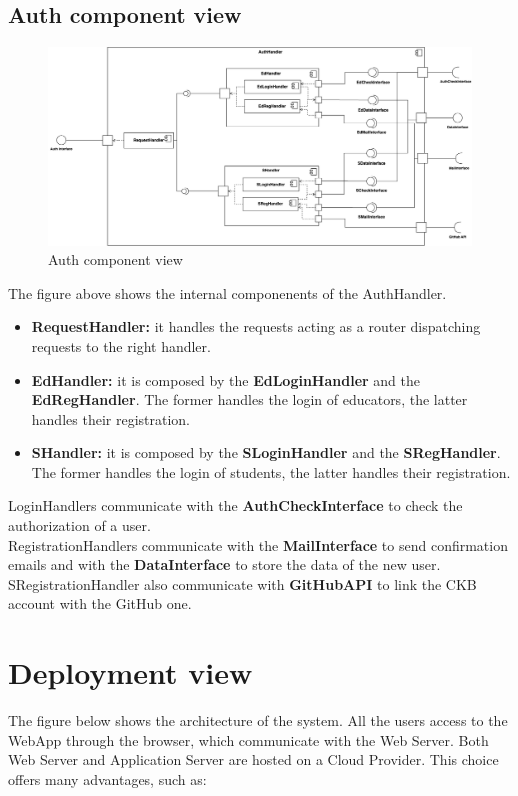 \subsection{Auth component view}
\begin{figure}[H]
    \centering
    \includegraphics[width=\textwidth]{images/component_view/Auth.png}
    \caption{Auth component view}
\end{figure}
The figure above shows the internal componenents of the AuthHandler.
\begin{itemize}
    \item \textbf{RequestHandler: } it handles the requests acting as a router dispatching requests to the right handler.
    \item \textbf{EdHandler: } it is composed by the \textbf{EdLoginHandler} and the \textbf{EdRegHandler}. The former handles the login of educators, 
    the latter handles their registration.
    \item \textbf{SHandler: } it is composed by the \textbf{SLoginHandler} and the \textbf{SRegHandler}. The former handles the login of students,
    the latter handles their registration.
\end{itemize}
LoginHandlers communicate with the \textbf{AuthCheckInterface} to check the authorization of a user.\\
RegistrationHandlers communicate with the \textbf{MailInterface} to send confirmation emails and with the \textbf{DataInterface} to store the data of the new user.\\
SRegistrationHandler also communicate with \textbf{GitHubAPI} to link the CKB account with the GitHub one.

\section{Deployment view}
The figure below shows the architecture of the system. All the users access to the WebApp through the browser, which communicate with
the Web Server. Both Web Server and Application Server are hosted on a Cloud Provider. This choice offers many
advantages, such as:

